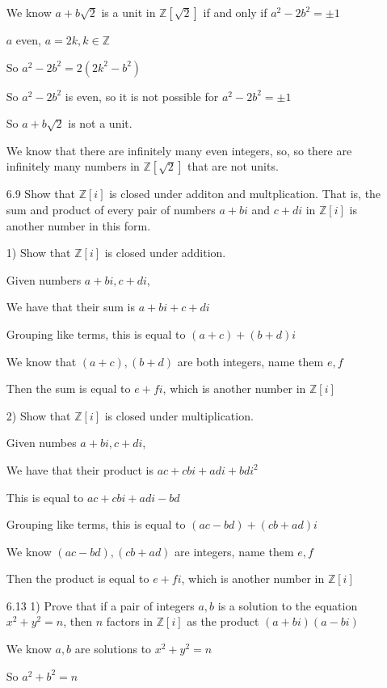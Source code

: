 \documentclass[11pt]{article}
\begin{document}
\begin{itemize}
	We know $a + b\sqrt{2}$ is a unit in $\mathbb{Z}[\sqrt{2}]$ if and only if $a^2 - 2b^2 = \pm 1$

	$a$ even, $a = 2k, k\in\mathbb{Z}$

	So $a^2 - 2b^2 = 2(2k^2 - b^2)$

	So $a^2 - 2b^2$ is even, so it is not possible for $a^2 - 2b^2 = \pm 1$

	So $a + b\sqrt{2}$ is not a unit.

	We know that there are infinitely many even integers, so, so there are infinitely many numbers in $\mathbb{Z}[\sqrt{2}]$ that are not units.

\newpage
\item[6.9]
	Show that $\mathbb{Z}[i]$ is closed under additon and multplication. That is, the sum and product of every pair of numbers $a + bi$ and $c + di$ in $\mathbb{Z}[i]$ is another number in this form.

	1) Show that $\mathbb{Z}[i]$ is closed under addition.
	
	Given numbers $a + bi, c + di$,

	We have that their sum is $a + bi + c + di$

	Grouping like terms, this is equal to $(a + c) + (b + d)i$

	We know that $(a + c), (b + d)$ are both integers, name them $e, f$

	Then the sum is equal to $e + fi$, which is another number in $\mathbb{Z}[i]$

	2) Show that $\mathbb{Z}[i]$ is closed under multiplication.

	Given numbes $a + bi, c + di$,

	We have that their product is $ac + cbi + adi + bdi^2$

	This is equal to $ac + cbi + adi - bd$

	Grouping like terms, this is equal to $(ac - bd) + (cb + ad)i$

	We know $(ac - bd), (cb + ad)$ are integers, name them $e, f$

	Then the product is equal to $e + fi$, which is another number in $\mathbb{Z}[i]$

\newpage
\item[6.13]
	1) Prove that if a pair of integers $a, b$ is a solution to the equation $x^2 + y^2 = n$, then $n$ factors in $\mathbb{Z}[i]$ as the product $(a + bi)(a - bi)$

	We know $a,b$ are solutions to $x^2 + y^2 = n$

	So $a^2 + b^2 = n$


\end{itemize}
\end{document}
